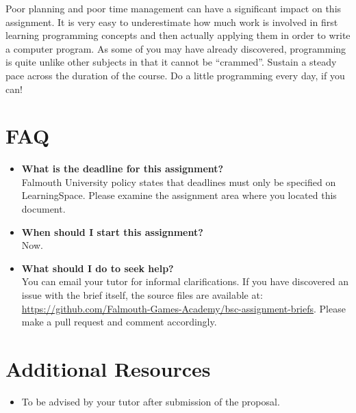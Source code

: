 \documentclass{../fal_assignment}
\begin{document}
Poor planning and poor time management can have a significant impact on this assignment. It is very easy to underestimate how much work is involved in first learning programming concepts and then actually applying them in order to write a computer program. As some of you may have already discovered, programming is quite unlike other subjects in that it cannot be ``crammed''. Sustain a steady pace across the duration of the course. Do a little programming every day, if you can!

\section*{FAQ}

\begin{itemize}
	\item 	\textbf{What is the deadline for this assignment?} \\ 
    		Falmouth University policy states that deadlines must only be specified on LearningSpace. Please examine the assignment area where you located this document.
    		
	\item 	\textbf{When should I start this assignment?} \\ 
    		Now.	
    		
	\item 	\textbf{What should I do to seek help?} \\ 
    		You can email your tutor for informal clarifications. If you have discovered an issue with the brief itself, the source files are available at: 
    		\url{https://github.com/Falmouth-Games-Academy/bsc-assignment-briefs}. Please make a pull request and comment accordingly.
\end{itemize}

\section*{Additional Resources}

\begin{itemize}
    \item To be advised by your tutor after submission of the proposal.
\end{itemize}
\end{document}
